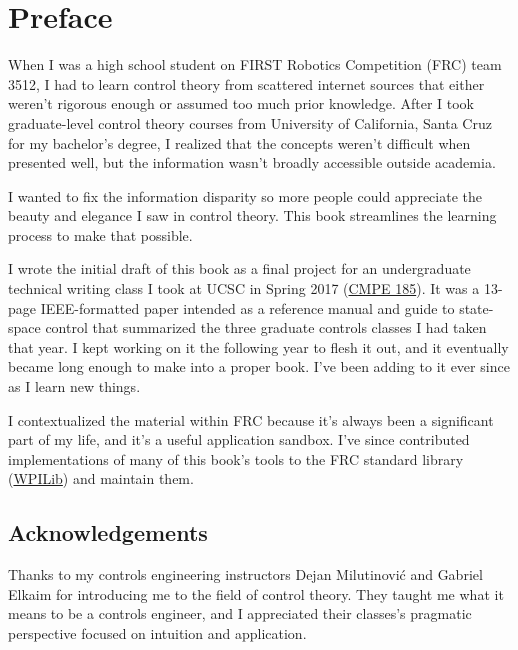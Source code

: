 
\chapter{Preface}

When I was a high school student on FIRST Robotics Competition (FRC) team 3512,
I had to learn control theory from scattered internet sources that either
weren't rigorous enough or assumed too much prior knowledge. After I took
graduate-level control theory courses from University of California, Santa Cruz
for my bachelor's degree, I realized that the concepts weren't difficult when
presented well, but the information wasn't broadly accessible outside academia.

I wanted to fix the information disparity so more people could appreciate the
beauty and elegance I saw in control theory. This book streamlines the learning
process to make that possible.

I wrote the initial draft of this book as a final project for an undergraduate
technical writing class I took at UCSC in Spring 2017
(\href{https://cmpe185-spring17-01.courses.soe.ucsc.edu/}{CMPE 185}). It was a
13-page IEEE-formatted paper intended as a reference manual and guide to
state-space control that summarized the three graduate controls classes I had
taken that year. I kept working on it the following year to flesh it out, and it
eventually became long enough to make into a proper book. I've been adding to it
ever since as I learn new things.

I contextualized the material within FRC because it's always been a significant
part of my life, and it's a useful application sandbox. I've since contributed
implementations of many of this book's tools to the FRC standard library
(\href{https://github.com/wpilibsuite/allwpilib}{WPILib}) and maintain them.

\section*{Acknowledgements}

Thanks to my controls engineering instructors Dejan Milutinovi\'c and Gabriel
Elkaim for introducing me to the field of control theory. They taught me what it
means to be a controls engineer, and I appreciated their classes's pragmatic
perspective focused on intuition and application.
